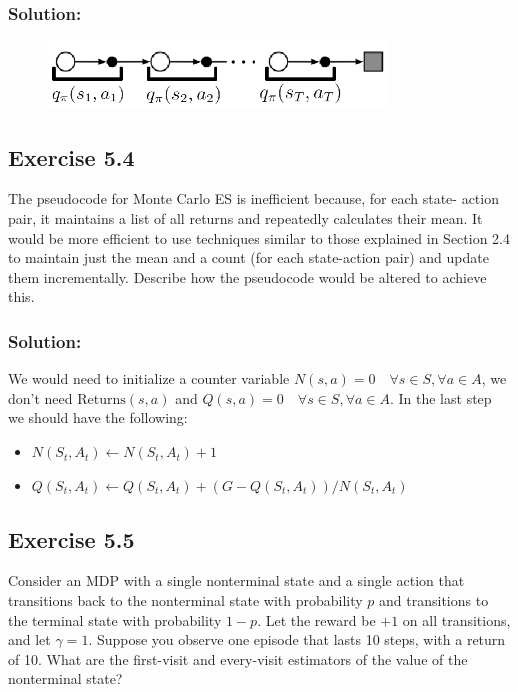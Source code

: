 \subsubsection*{Solution:}

\begin{figure}[H]
    \centering
    \includegraphics[width=0.8\textwidth]{chapters_latex/figures/ex_05_03.png}
\end{figure}


\subsection*{Exercise 5.4}
The pseudocode for Monte Carlo ES is inefficient because, for each state-
action pair, it maintains a list of all returns and repeatedly calculates their mean. It would
be more efficient to use techniques similar to those explained in Section 2.4 to maintain
just the mean and a count (for each state-action pair) and update them incrementally.
Describe how the pseudocode would be altered to achieve this.

\subsubsection*{Solution:}
We would need to initialize a counter variable $N(s,a) = 0 \quad \forall s \in S, \forall a \in A$, we don't need $\text{Returns}(s,a)$ and $Q(s,a)=0 \quad \forall s \in S, \forall a \in A$. 
In the last step we should have the following:
\begin{itemize}
    \item[] $N(S_t, A_t) \leftarrow N(S_t, A_t) + 1$
    \item[] $Q(S_t, A_t) \leftarrow Q(S_t, A_t) + (G - Q(S_t, A_t))/N(S_t, A_t)$
\end{itemize}

\subsection*{Exercise 5.5}
Consider an MDP with a single nonterminal state and a single action
that transitions back to the nonterminal state with probability $p$ and transitions to the
terminal state with probability $1-p$. Let the reward be $+1$ on all transitions, and let
$\gamma = 1$. Suppose you observe one episode that lasts 10 steps, with a return of 10. What
are the first-visit and every-visit estimators of the value of the nonterminal state?

